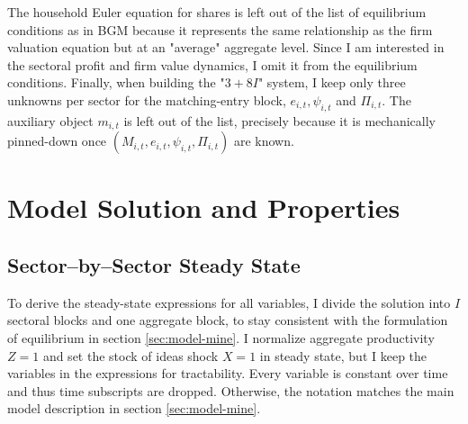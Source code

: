 \documentclass[a4paper,12pt]{article} %
\numberwithin{equation}{section} %
\numberwithin{figure}{section}
\numberwithin{table}{section}
\begin{document}
The household Euler equation for shares is left out of the list of equilibrium conditions as in BGM because it represents the same relationship 
as the firm valuation equation but at an "average" aggregate level. Since I am interested in the sectoral profit and firm value dynamics, I omit it from the 
equilibrium conditions. Finally, when building the "$3 + 8I$" system, I keep only three unknowns per sector for the 
matching-entry block, $ e_{i,t},  \psi_{i,t}$ and $\Pi_{i,t}$. The auxiliary object \( m_{i,t} \) is left out of the list, 
precisely because it is mechanically pinned-down once \( (M_{i,t}, e_{i,t}, \psi_{i,t},\Pi_{i,t}) \) are known.


\section{Model Solution and Properties}
\label{sec:solution}


\subsection{Sector–by–Sector Steady State}
\label{sec:solution-steadystate}

To derive the steady-state expressions for all variables, I divide the solution into $I$ sectoral blocks and one aggregate block, to stay consistent
with the formulation of equilibrium in section \ref{sec:model-mine}. I normalize aggregate productivity $Z = 1$ and set the stock of ideas shock
$X = 1$ in steady state, but I keep the variables in the expressions for tractability. Every variable is constant over time and thus time subscripts
are dropped. Otherwise, the notation matches the main model description in section \ref{sec:model-mine}.
\end{document}
